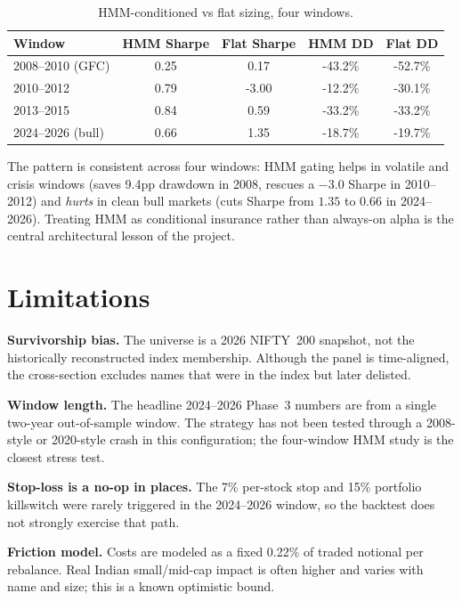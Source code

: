 \documentclass[conference]{IEEEtran}
\begin{document}
\begin{table}[ht]
\centering
\caption{HMM-conditioned vs flat sizing, four windows.}
\label{tab:hmm}
\begin{tabular}{lcccc}
\toprule
\textbf{Window} & \textbf{HMM Sharpe} & \textbf{Flat Sharpe} & \textbf{HMM DD} & \textbf{Flat DD} \\
\midrule
2008--2010 (GFC)   & 0.25 & 0.17  & -43.2\% & -52.7\% \\
2010--2012         & 0.79 & -3.00 & -12.2\% & -30.1\% \\
2013--2015         & 0.84 & 0.59  & -33.2\% & -33.2\% \\
2024--2026 (bull)  & 0.66 & 1.35  & -18.7\% & -19.7\% \\
\bottomrule
\end{tabular}
\end{table}

The pattern is consistent across four windows: HMM gating helps in volatile
and crisis windows (saves 9.4pp drawdown in 2008, rescues a $-3.0$ Sharpe in
2010--2012) and \emph{hurts} in clean bull markets (cuts Sharpe from $1.35$ to
$0.66$ in 2024--2026). Treating HMM as conditional insurance rather than
always-on alpha is the central architectural lesson of the project.

\section{Limitations}
\textbf{Survivorship bias.} The universe is a 2026 NIFTY~200 snapshot, not the
historically reconstructed index membership. Although the panel is
time-aligned, the cross-section excludes names that were in the index but
later delisted.

\textbf{Window length.} The headline 2024--2026 Phase~3 numbers are from a
single two-year out-of-sample window. The strategy has not been tested
through a 2008-style or 2020-style crash in this configuration; the
four-window HMM study is the closest stress test.

\textbf{Stop-loss is a no-op in places.} The 7\% per-stock stop and 15\%
portfolio killswitch were rarely triggered in the 2024--2026 window, so the
backtest does not strongly exercise that path.

\textbf{Friction model.} Costs are modeled as a fixed 0.22\% of traded
notional per rebalance. Real Indian small/mid-cap impact is often higher and
varies with name and size; this is a known optimistic bound.
\end{document}
